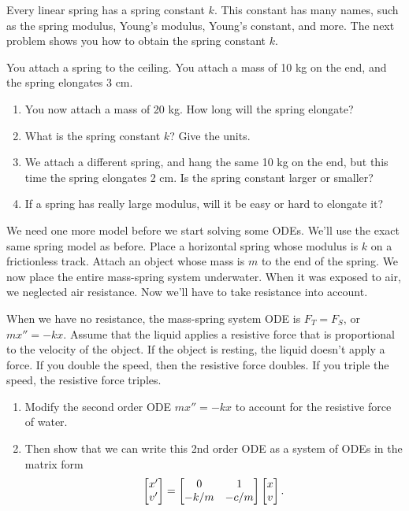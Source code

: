 Every linear spring has a spring constant $k$. This constant has many names, such as the spring modulus, Young's modulus, Young's constant, and more. The next problem shows you how to obtain the spring constant $k$.
\begin{problem}
 You attach a spring to the ceiling. You attach a mass of 10 kg on the end, and the spring elongates 3 cm.  
\begin{enumerate}
 \item You now attach a mass of 20 kg. How long will the spring elongate? 
 \item What is the spring constant $k$? Give the units.
 \item We attach a different spring, and hang the same 10 kg on the end, but this time the spring elongates 2 cm.  Is the spring constant larger or smaller?
 \item If a spring has really large modulus, will it be easy or hard to elongate it?
\end{enumerate}
\end{problem}

We need one more model before we start solving some ODEs.  We'll use the exact same spring model as before. Place a horizontal spring whose modulus is $k$ on a frictionless track. Attach an object whose mass is $m$ to the end of the spring.  
We now place the entire mass-spring system underwater. When it was exposed to air, we neglected air resistance. Now we'll have to take resistance into account.   
\begin{problem}\label{mass-spring set up problem}
 When we have no resistance, the mass-spring system ODE is $F_T=F_S$, or $mx'' = -kx$.  Assume that the liquid applies a resistive force that is proportional to the velocity of the object.  If the object is resting, the liquid doesn't apply a force.  If you double the speed, then the resistive force doubles.  If you triple the speed, the resistive force triples. 
\begin{enumerate}
 \item Modify the second order ODE $mx''=-kx$ to account for the resistive force of water. 
 \item Then show that we can write this 2nd order ODE as a system of ODEs in the matrix form
$$\begin{bmatrix} x'\\v' \end{bmatrix} = \begin{bmatrix} 0&1\\-k/m&-c/m \end{bmatrix}\begin{bmatrix} x\\v \end{bmatrix}.$$

\end{enumerate}

\end{problem}












